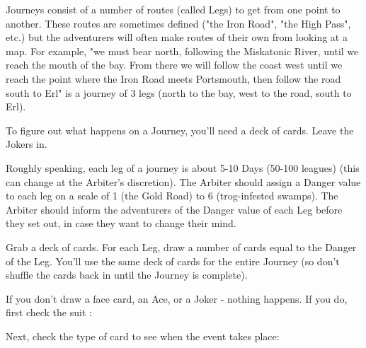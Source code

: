 {\begin{multicols}{2}

Journeys consist of a number of routes (called Legs) to get from one point to another.  These routes are sometimes defined ("the Iron Road", "the High Pass", etc.) but the adventurers will often make routes of their own from looking at a map.  For example, "we must bear north, following the Miskatonic River, until we reach the mouth of the bay.  From there we will follow the coast west until we reach the point where the Iron Road meets Portsmouth, then follow the road south to Erl" is a journey of 3 legs (north to the bay, west to the road, south to Erl).

To figure out what happens on a Journey, you'll need a deck of cards.  Leave the Jokers in.

Roughly speaking, each leg of a journey is about 5-10 Days (50-100 leagues) (this can change at the Arbiter's discretion).  The Arbiter should assign a Danger value to each leg on a scale of 1 (the Gold Road) to 6 (trog-infested swamps).  The Arbiter should inform the adventurers of the Danger value of each Leg before they set out, in case they want to change their mind.

Grab a deck of cards.  For each Leg, draw a number of cards equal to the Danger of the Leg.  You'll use the same deck of cards for the entire Journey (so don't shuffle the cards back in until the Journey is complete).

If you don't draw a face card, an Ace, or a Joker - nothing happens.  If you do, first check the suit :


  Next, check the type of card to see when the event takes place:



\end{multicols}}
